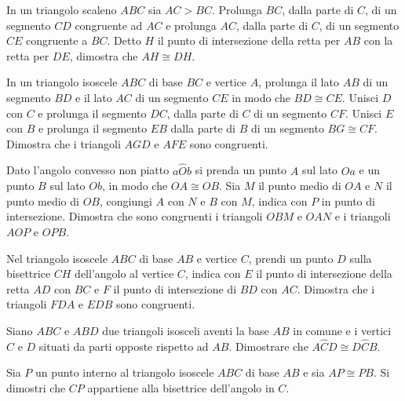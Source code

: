 \begin{multicols}{2}
\begin{esercizio}
\label{ese:2.66}
In un triangolo scaleno $ABC$ sia $AC>BC$. Prolunga $BC$, dalla parte di $C$, di un segmento $CD$ congruente ad $AC$ e prolunga $AC$, dalla parte di $C$, di un segmento $CE$ congruente a $BC$. Detto $H$ il punto di intersezione della retta per $AB$ con la retta per $DE$, dimostra che $AH\cong DH$.
\end{esercizio}

\begin{esercizio}
\label{ese:2.67}
In un triangolo isoscele $ABC$ di base $BC$ e vertice $A$, prolunga il lato $AB$ di un segmento $BD$ e il lato $AC$ di un segmento $CE$ in modo che $BD\cong CE$. Unisci $D$ con $C$ e prolunga il segmento $DC$, dalla parte di $C$ di un segmento $CF$. Unisci $E$ con $B$ e prolunga il segmento $EB$ dalla parte di $B$ di un segmento $BG\cong CF$. Dimostra che i triangoli $AGD$ e $AFE$ sono congruenti.
\end{esercizio}

\begin{esercizio}
\label{ese:2.68}
Dato l'angolo convesso non piatto $a\widehat{O}b$ si prenda un punto $A$ sul lato $Oa$ e un punto $B$ sul lato $Ob$, in modo che $OA\cong OB$. Sia $M$ il punto medio di $OA$ e $N$ il punto medio di $OB$, congiungi $A$ con $N$ e $B$ con $M$, indica con $P$ in punto di intersezione. Dimostra che sono congruenti i triangoli $OBM$ e $OAN$ e i triangoli $AOP$ e $OPB$.
\end{esercizio}

\begin{esercizio}
\label{ese:2.69}
Nel triangolo isoscele $ABC$ di base $AB$ e vertice $C$, prendi un punto $D$ sulla bisettrice $CH$ dell'angolo al vertice $C$, indica con $E$ il punto di intersezione della retta $AD$ con $BC$ e $F$ il punto di intersezione di $BD$ con $AC$. Dimostra che i triangoli $FDA$ e $EDB$ sono congruenti.
\end{esercizio}

\begin{esercizio}
\label{ese:2.70}
Siano $ABC$ e $ABD$ due triangoli isosceli aventi la base $AB$ in comune e i vertici $C$ e $D$ situati da parti opposte rispetto ad $AB$. Dimostrare che $A\widehat{C}D\cong D\widehat{C}B$.
\end{esercizio}

\begin{esercizio}
\label{ese:2.71}
Sia $P$ un punto interno al triangolo isoscele $ABC$ di base $AB$ e sia $AP\cong PB$. Si dimostri che $CP$ appartiene alla bisettrice dell'angolo in $C$.
\end{esercizio}


\end{multicols}
